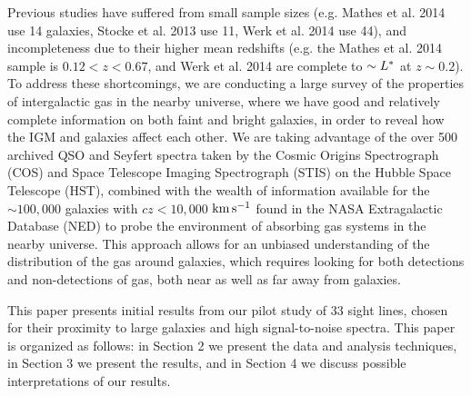 \documentclass[iop]{emulateapj-rtx4}
\begin{document}
Previous studies have suffered from small sample sizes (e.g. Mathes et al. 2014 use 14 galaxies, Stocke et al. 2013 use 11, Werk et al. 2014 use 44), and incompleteness due to their higher mean redshifts (e.g. the Mathes et al. 2014 sample is $0.12 <z<0.67$, and Werk et al. 2014 are complete to $\sim L^{\**}$ at $z\sim0.2$). To address these shortcomings, we are conducting a large survey of the properties of intergalactic gas in the nearby universe, where we have good and relatively complete information on both faint and bright galaxies, in order to reveal how the IGM and galaxies affect each other. We are taking advantage of the over 500 archived QSO and Seyfert spectra taken by the Cosmic Origins Spectrograph (COS) and Space Telescope Imaging Spectrograph (STIS) on the Hubble Space Telescope (HST), combined with the wealth of information available for the $\sim100,000$ galaxies with $cz<10,000$ $\rm km\, s^{-1}$ found in the NASA Extragalactic Database (NED) to probe the environment of absorbing gas systems in the nearby universe. This approach allows for an unbiased understanding of the distribution of the gas around galaxies, which requires looking for both detections and non-detections of gas, both near as well as far away from galaxies.

This paper presents initial results from our pilot study of 33 sight lines, chosen for their proximity to large galaxies and high signal-to-noise spectra. This paper is organized as follows: in Section 2 we present the data and analysis techniques, in Section 3 we present the results, and in Section 4 we discuss possible interpretations of our results.


\end{document}
